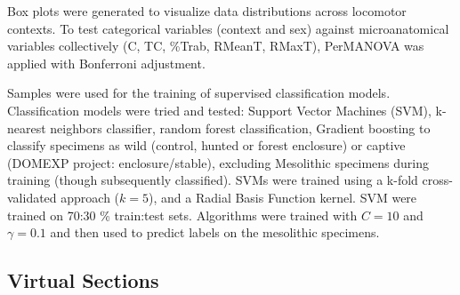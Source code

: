 \documentclass[12pt,a4paper]{article}
\begin{document}
Box plots were generated to visualize data distributions across locomotor contexts. To test categorical variables (context and sex) against microanatomical variables collectively (C, TC, \%Trab, RMeanT, RMaxT), PerMANOVA was applied with Bonferroni adjustment. %

Samples were used for the training of supervised classification models. Classification models were tried and tested: Support Vector Machines (SVM), k-nearest neighbors classifier, random forest classification, Gradient boosting to classify specimens as wild (control, hunted or forest enclosure) or captive (DOMEXP project: enclosure/stable), excluding Mesolithic specimens during training (though subsequently classified).
SVMs were trained using a k-fold cross-validated approach ($k = 5$), and a Radial Basis Function kernel. SVM were trained on 70:30 \% train:test sets. Algorithms were trained with $C = 10$ and $\gamma = 0.1$ and then used to predict labels on the mesolithic specimens.

\subsection{Virtual Sections}
\end{document}
